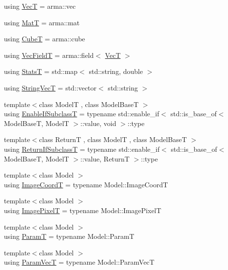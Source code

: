 \begin{DoxyCompactItemize}
using \hyperlink{namespacemappel_a2225ad69f358daa3f4f99282a35b9a3a}{VecT} = arma\+::vec
\item 
using \hyperlink{namespacemappel_a7091ab87c528041f7e2027195fad8915}{MatT} = arma\+::mat
\item 
using \hyperlink{namespacemappel_ab2afab4e6c8805e83946670d882768c2}{CubeT} = arma\+::cube
\item 
using \hyperlink{namespacemappel_a834ec4f32487f07c0ca1e22d4928d1f8}{Vec\+FieldT} = arma\+::field$<$ \hyperlink{namespacemappel_a2225ad69f358daa3f4f99282a35b9a3a}{VecT} $>$
\item 
using \hyperlink{namespacemappel_a04ab395b0cf82c4ce68a36b2212649a5}{StatsT} = std\+::map$<$ std\+::string, double $>$
\item 
using \hyperlink{namespacemappel_aae88cf18bccfbb789a6019bcfbbfca68}{String\+VecT} = std\+::vector$<$ std\+::string $>$
\item 
{\footnotesize template$<$class ModelT , class Model\+BaseT $>$ }\\using \hyperlink{namespacemappel_a5ee1448a35c267ee0bc4b8f1a2e09615}{Enable\+If\+SubclassT} = typename std\+::enable\+\_\+if$<$ std\+::is\+\_\+base\+\_\+of$<$ Model\+BaseT, ModelT $>$\+::value, void $>$\+::type
\item 
{\footnotesize template$<$class ReturnT , class ModelT , class Model\+BaseT $>$ }\\using \hyperlink{namespacemappel_a3b77d227658ba3ba9e16fea6fa6e626d}{Return\+If\+SubclassT} = typename std\+::enable\+\_\+if$<$ std\+::is\+\_\+base\+\_\+of$<$ Model\+BaseT, ModelT $>$\+::value, ReturnT $>$\+::type
\item 
{\footnotesize template$<$class Model $>$ }\\using \hyperlink{namespacemappel_a3ca6340183a2876d6bb6da936f1b667d}{Image\+CoordT} = typename Model\+::\+Image\+CoordT
\item 
{\footnotesize template$<$class Model $>$ }\\using \hyperlink{namespacemappel_a0b957a712590555ab00a1d0617a7f66f}{Image\+PixelT} = typename Model\+::\+Image\+PixelT
\item 
{\footnotesize template$<$class Model $>$ }\\using \hyperlink{namespacemappel_a667925cb0d6c0e49f2f035cc5a9a6857}{ParamT} = typename Model\+::\+ParamT
\item 
{\footnotesize template$<$class Model $>$ }\\using \hyperlink{namespacemappel_a0f86d3153e4e27b095012f140eea58de}{Param\+VecT} = typename Model\+::\+Param\+VecT

\end{DoxyCompactItemize}
